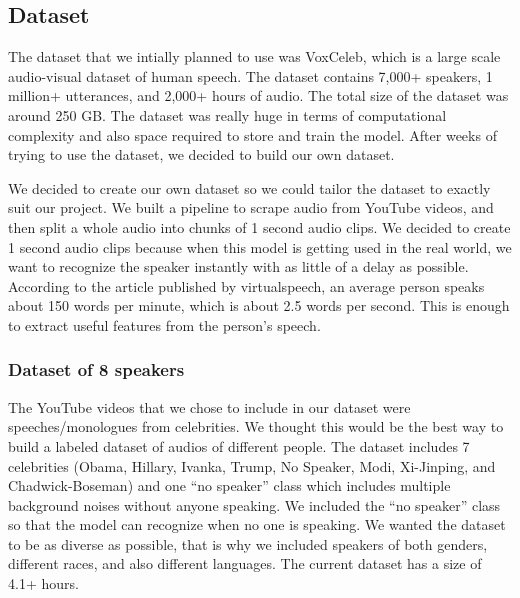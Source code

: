 \documentclass[10pt,twocolumn,letterpaper]{article}
\begin{document}
\subsection{Dataset}

The dataset that we intially planned to use was VoxCeleb, which is a large scale audio-visual dataset of human speech. The dataset contains 7,000+ speakers, 1 million+ utterances, and 2,000+ hours of audio. The total size of the dataset was around 250 GB. The dataset was really huge in terms of computational complexity and also space required to store and train the model. After weeks of trying to use the dataset, we decided to build our own dataset. 

We decided to create our own dataset so we could tailor the dataset to exactly suit our project. We built a pipeline to scrape audio from YouTube videos, and then split a whole audio into chunks of 1 second audio clips. We decided to create 1 second audio clips because when this model is getting used in the real world, we want to recognize the speaker instantly with as little of a delay as possible. According to the article \cite{Barnard} published by virtualspeech, an average person speaks about 150 words per minute, which is about 2.5 words per second. This is enough to extract useful features from the person’s speech.  


\subsubsection{Dataset of 8 speakers}

The YouTube videos that we chose to include in our dataset were speeches/monologues from celebrities. We thought this would be the best way to build a labeled dataset of audios of different people. The dataset includes 7 celebrities (Obama, Hillary, Ivanka, Trump, No Speaker, Modi, Xi-Jinping, and Chadwick-Boseman) and one “no speaker” class which includes multiple background noises without anyone speaking. We included the “no speaker” class so that the model can recognize when no one is speaking.  We wanted the dataset to be as diverse as possible, that is why we included speakers of both genders, different races, and also different languages. The current dataset has a size of 4.1+ hours. 
\end{document}
